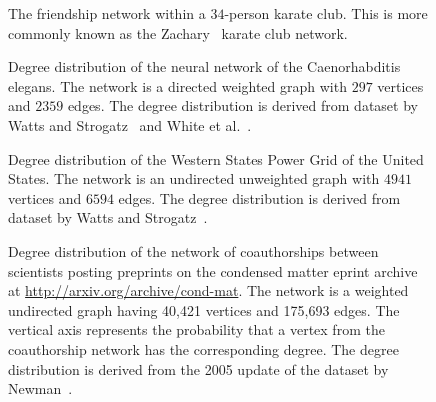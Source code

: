 \begin{figure}[!htbp]
\centering

\caption{The friendship network within a $34$-person karate club. This
  is more commonly known as the
  Zachary~\cite{Zachary1977} karate
  club network.}
\label{fig:random_graphs:Zachary_karate_club}
\end{figure}

\begin{figure}[!htbp]
\centering
{}

\caption{Degree distribution of the neural network of the
  Caenorhabditis elegans. The network is a directed weighted graph
  with $297$ vertices and $2359$ edges. The degree distribution is
  derived from dataset by Watts and Strogatz~\cite{WattsStrogatz1998}
  and White et al.~\cite{WhiteEtAl1986}.}
\label{fig:random_graphs:degree_distribution:neural_network_C_elegans}
\end{figure}

\begin{figure}[!htbp]
\centering
{}

\caption{Degree distribution of the Western States Power Grid of the
  United States. The network is an undirected unweighted graph with
  $4941$ vertices and $6594$ edges. The degree distribution is derived
  from dataset by Watts and Strogatz~\cite{WattsStrogatz1998}.}
\label{fig:random_graphs:degree_distribution:power_grid}
\end{figure}

\begin{figure}[!htbp]
\centering
{}

\caption{Degree distribution of the network of coauthorships between
  scientists posting preprints on the condensed matter eprint archive
  at \url{http://arxiv.org/archive/cond-mat}. The network is a
  weighted undirected graph having 40,421 vertices and 175,693
  edges. The vertical axis represents the probability that a vertex
  from the coauthorship network has the corresponding degree. The
  degree distribution is derived from the 2005 update of the dataset
  by Newman~\cite{Newman2001b}.}
\label{fig:random_graphs:degree_distribution:condensed_matter_collaboration}
\end{figure}

